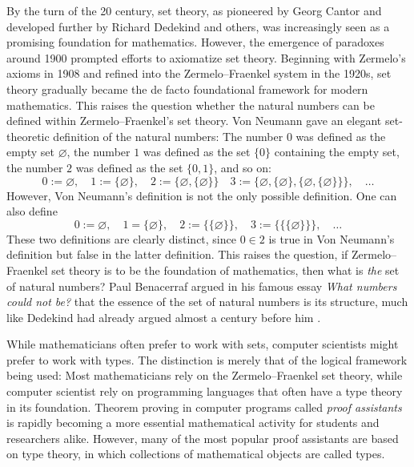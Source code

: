 By the turn of the 20\supth{} century, set theory, as pioneered by Georg Cantor and developed further by Richard Dedekind and others, was increasingly seen as a promising foundation for mathematics. However, the emergence of paradoxes around 1900 prompted efforts to axiomatize set theory. Beginning with Zermelo's axioms in 1908 and refined into the Zermelo--Fraenkel system in the 1920s, set theory gradually became the de facto foundational framework for modern mathematics. This raises the question whether the natural numbers can be defined within Zermelo--Fraenkel's set theory. Von Neumann gave an elegant set-theoretic definition of the natural numbers: The number $0$ was defined as the empty set $\varnothing$, the number $1$ was defined as the set $\{0\}$ containing the empty set, the number $2$ was defined as the set $\{0,1\}$, and so on:
\begin{equation*}
  0:=\varnothing,\quad 1:=\{\varnothing\},\quad 2:=\{\varnothing,\{\varnothing\}\}\quad 3:=\{\varnothing,\{\varnothing\},\{\varnothing,\{\varnothing\}\}\},\quad\ldots
\end{equation*}
However, Von Neumann's definition is not the only possible definition. One can also define
\begin{equation*}
  0:=\varnothing,\quad 1=\{\varnothing\}, \quad 2:=\{\{\varnothing\}\},\quad 3 := \{\{\{\varnothing\}\}\},\quad\ldots
\end{equation*}
These two definitions are clearly distinct, since $0\in 2$ is true in Von Neumann's definition but false in the latter definition. This raises the question, if Zermelo--Fraenkel set theory is to be the foundation of mathematics, then what is \emph{the} set of natural numbers? Paul Benacerraf argued in his famous essay \emph{What numbers could not be?} that the essence of the set of natural numbers is its structure, much like Dedekind had already argued almost a century before him \cite{benacerraf1965}.

While mathematicians often prefer to work with sets, computer scientists might prefer to work with types.  The distinction is merely that of the logical framework being used: Most mathematicians rely on the Zermelo--Fraenkel set theory, while computer scientist rely on programming languages that often have a type theory in its foundation. Theorem proving in computer programs called \emph{proof assistants} is rapidly becoming a more essential mathematical activity for students and researchers alike. However, many of the most popular proof assistants are based on type theory, in which collections of mathematical objects are called types.

